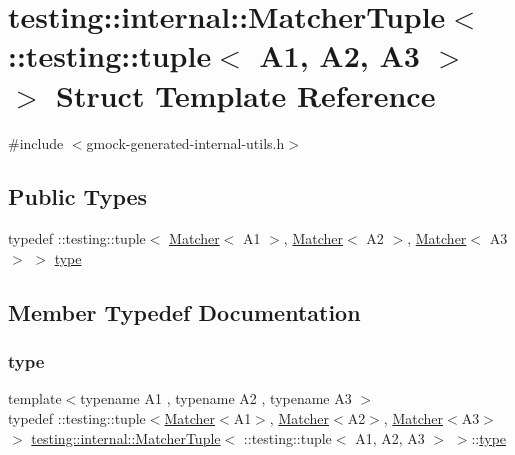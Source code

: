 \hypertarget{structtesting_1_1internal_1_1MatcherTuple_3_01_1_1testing_1_1tuple_3_01A1_00_01A2_00_01A3_01_4_01_4}{}\section{testing\+::internal\+::Matcher\+Tuple$<$ \+::testing\+::tuple$<$ A1, A2, A3 $>$ $>$ Struct Template Reference}
\label{structtesting_1_1internal_1_1MatcherTuple_3_01_1_1testing_1_1tuple_3_01A1_00_01A2_00_01A3_01_4_01_4}


{\ttfamily \#include $<$gmock-\/generated-\/internal-\/utils.\+h$>$}

\subsection*{Public Types}
\begin{DoxyCompactItemize}
\item 
typedef \+::testing\+::tuple$<$ \mbox{\hyperlink{classtesting_1_1Matcher}{Matcher}}$<$ A1 $>$, \mbox{\hyperlink{classtesting_1_1Matcher}{Matcher}}$<$ A2 $>$, \mbox{\hyperlink{classtesting_1_1Matcher}{Matcher}}$<$ A3 $>$ $>$ \mbox{\hyperlink{structtesting_1_1internal_1_1MatcherTuple_3_01_1_1testing_1_1tuple_3_01A1_00_01A2_00_01A3_01_4_01_4_a14ce558da46f2d3829b2dfacdab2c980}{type}}
\end{DoxyCompactItemize}


\subsection{Member Typedef Documentation}
\mbox{\label{structtesting_1_1internal_1_1MatcherTuple_3_01_1_1testing_1_1tuple_3_01A1_00_01A2_00_01A3_01_4_01_4_a14ce558da46f2d3829b2dfacdab2c980}} 
\subsubsection{\texorpdfstring{type}{type}}
{\footnotesize\ttfamily template$<$typename A1 , typename A2 , typename A3 $>$ \\
typedef \+::testing\+::tuple$<$\mbox{\hyperlink{classtesting_1_1Matcher}{Matcher}}$<$A1$>$, \mbox{\hyperlink{classtesting_1_1Matcher}{Matcher}}$<$A2$>$, \mbox{\hyperlink{classtesting_1_1Matcher}{Matcher}}$<$A3$>$ $>$ \mbox{\hyperlink{structtesting_1_1internal_1_1MatcherTuple}{testing\+::internal\+::\+Matcher\+Tuple}}$<$ \+::testing\+::tuple$<$ A1, A2, A3 $>$ $>$\+::\mbox{\hyperlink{structtesting_1_1internal_1_1MatcherTuple_3_01_1_1testing_1_1tuple_3_01A1_00_01A2_00_01A3_01_4_01_4_a14ce558da46f2d3829b2dfacdab2c980}{type}}}



